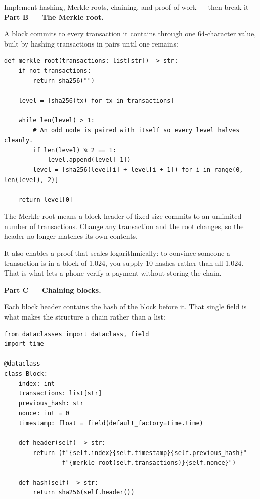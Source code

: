 \begin{labproject}{Implement hashing, Merkle roots, chaining, and proof of work --- then break it}
\medskip\noindent\textbf{Part B --- The Merkle root.}\par
A block commits to every transaction it contains through one 64-character value, built by hashing transactions in pairs until one remains:

\begin{lstlisting}[style=utppython]
def merkle_root(transactions: list[str]) -> str:
    if not transactions:
        return sha256("")

    level = [sha256(tx) for tx in transactions]

    while len(level) > 1:
        # An odd node is paired with itself so every level halves cleanly.
        if len(level) % 2 == 1:
            level.append(level[-1])
        level = [sha256(level[i] + level[i + 1]) for i in range(0, len(level), 2)]

    return level[0]
\end{lstlisting}

\begin{keyidea}
The Merkle root means a block header of fixed size commits to an unlimited number of transactions. Change any transaction and the root changes, so the header no longer matches its own contents.

It also enables a proof that scales logarithmically: to convince someone a transaction is in a block of 1{,}024, you supply 10 hashes rather than all 1{,}024. That is what lets a phone verify a payment without storing the chain.
\end{keyidea}

\medskip\noindent\textbf{Part C --- Chaining blocks.}\par
Each block header contains the hash of the block before it. That single field is what makes the structure a chain rather than a list:

\begin{lstlisting}[style=utppython]
from dataclasses import dataclass, field
import time

@dataclass
class Block:
    index: int
    transactions: list[str]
    previous_hash: str
    nonce: int = 0
    timestamp: float = field(default_factory=time.time)

    def header(self) -> str:
        return (f"{self.index}{self.timestamp}{self.previous_hash}"
                f"{merkle_root(self.transactions)}{self.nonce}")

    def hash(self) -> str:
        return sha256(self.header())
\end{lstlisting}


\end{labproject}
